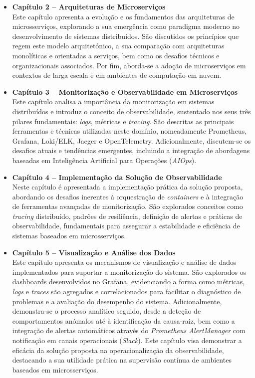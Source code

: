 \begin{itemize}
    \item \textbf{Capítulo 2 – Arquiteturas de Microserviços} \\
    Este capítulo apresenta a evolução e os fundamentos das arquiteturas de microsserviços, explorando a sua emergência como paradigma moderno no desenvolvimento de sistemas distribuídos. São discutidos os princípios que regem este modelo arquitetónico, a sua comparação com arquiteturas monolíticas e orientadas a serviços, bem como os desafios técnicos e organizacionais associados. Por fim, aborda-se a adoção de microserviços em contextos de larga escala e em ambientes de computação em nuvem.

    \item \textbf{Capítulo 3 – Monitorização e Observabilidade em Microserviços} \\
    Este capítulo analisa a importância da monitorização em sistemas distribuídos e introduz o conceito de observabilidade, sustentado nos seus três pilares fundamentais: \textit{logs}, métricas e \textit{tracing}. São descritas as principais ferramentas e técnicas utilizadas neste domínio, nomeadamente Prometheus, Grafana, Loki/ELK, Jaeger e OpenTelemetry. Adicionalmente, discutem-se os desafios atuais e tendências emergentes, incluindo a integração de abordagens baseadas em Inteligência Artificial para Operações (\textit{AIOps}).

    \item \textbf{Capítulo 4 – Implementação da Solução de Observabilidade} \\
    Neste capítulo é apresentada a implementação prática da solução proposta, abordando os desafios inerentes à orquestração de \textit{containers} e à integração de ferramentas avançadas de monitorização. São explorados conceitos como \textit{tracing} distribuído, padrões de resiliência, definição de alertas e práticas de observabilidade, fundamentais para assegurar a estabilidade e eficiência de sistemas baseados em microsserviços.

    \item \textbf{Capítulo 5 – Visualização e Análise dos Dados} \\
    Este capítulo apresenta os mecanismos de visualização e análise de dados implementados para suportar a monitorização do sistema. São explorados os dashboards desenvolvidos no Grafana, evidenciando a forma como métricas, \textit{logs} e \textit{traces} são agregados e correlacionados para facilitar o diagnóstico de problemas e a avaliação do desempenho do sistema. Adicionalmente, demonstra-se o processo analítico seguido, desde a deteção de comportamentos anómalos até à identificação da causa-raiz, bem como a integração de alertas automáticos através do \textit{Prometheus AlertManager} com notificação em canais operacionais (\textit{Slack}). Este capítulo visa demonstrar a eficácia da solução proposta na operacionalização da observabilidade, destacando a sua utilidade prática na supervisão contínua de ambientes baseados em microsserviços.


\end{itemize}
